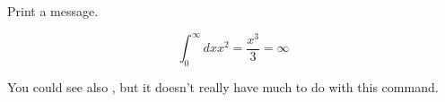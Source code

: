 
Print a message.

$$
\int_0^\infty dx x^2 = \frac{x^3}{3} = \infty
$$

You could see also , but it doesn't really have much to do with this command.
